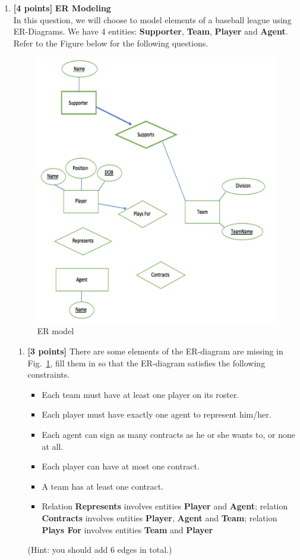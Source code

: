 \documentclass[10pt]{article}
\begin{document}
\begin{enumerate}

	\item \textbf{[4 points]} \textbf{ER Modeling} \\
	      In this question, we will choose to model elements of a baseball league using ER-Diagrams. We have 4 entities:
	      \textbf{Supporter}, \textbf{Team}, \textbf{Player} and \textbf{Agent}. Refer to the Figure below for the following questions.
	      \begin{figure}[ht]
		      \centering
		      \includegraphics[width=0.7\linewidth]{pro2}
		      \caption{ER model}
		      \label{fig_pro2}
	      \end{figure}

	      \begin{enumerate}
		      \item \textbf{[3 points]} There are some elements of the ER-diagram are missing in Fig.~\ref{fig_pro2},
		            fill them in so that the ER-diagram satisfies the following constraints.
		            \begin{itemize}
			            \item Each team must have at least one player on its roster.
			            \item Each player must have exactly one agent to represent him/her.
			            \item Each agent can sign as many contracts as he or she wants to, or none at all.
			            \item Each player can have at most one contract.
			            \item A team has at least one contract.
			            \item Relation \textbf{Represents} involves entities \textbf{Player} and \textbf{Agent}; relation \textbf{Contracts} involves
			                  entities \textbf{Player}, \textbf{Agent} and \textbf{Team}; relation \textbf{Plays For} involves entities \textbf{Team} and \textbf{Player}
		            \end{itemize}
		            (Hint: you should add 6 edges in total.) \\


\end{enumerate}
\end{enumerate}
\end{document}
